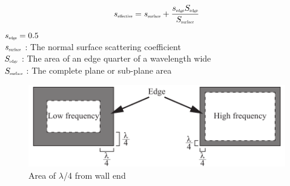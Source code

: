 \vspace{0.8cm}

\begin{table}[htbp]
\begin{equation}
 \label{eq:付加乱反射率計算式}
 s_{\scalebox{0.5}{effective}} = s_{\scalebox{0.5}{surface}} + \frac{s_{\scalebox{0.5}{edge}}
 S_{\scalebox{0.5}{edge}}}{S_{\scalebox{0.5}{surface}}}\\
\end{equation}
\hspace{2cm}$s_{\scalebox{0.5}{edge}} = 0.5$\\
\hspace{2cm}$s_{\scalebox{0.5}{surface}}$ : The normal surface scattering coefficient\\
\hspace{2cm}$S_{\scalebox{0.5}{edge}}$ : The area of an edge quarter of a wavelength wide\\
\hspace{2cm}$S_{\scalebox{0.5}{surface}}$ : The complete plane or sub-plane area\\
\end{table}

\begin{figure}[htbp]
    \centering
    \includegraphics[keepaspectratio,scale=0.8]{02_att/edge.pdf}
    \caption{\hspace{1mm}Area of $\lambda$/4 from wall end}
    \label{fig:壁面端部}
\end{figure}

